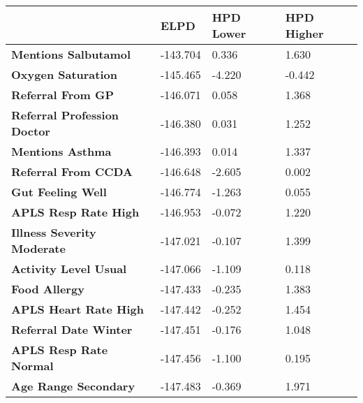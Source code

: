 \renewcommand*{\arraystretch}{1.2}
\scriptsize{
    \begin{longtable}[H]{llll}
        \toprule
                                              & \textbf{ELPD} & \textbf{HPD Lower} & \textbf{HPD Higher} \\\toprule
        \endhead
        \textbf{Mentions Salbutamol}          & -143.704           & 0.336               & 1.630                \\
        \textbf{Oxygen Saturation}                          & -145.465           & -4.220              & -0.442               \\
        \textbf{Referral From GP}               & -146.071           & 0.058               & 1.368                \\
        \textbf{Referral Profession Doctor}     & -146.380           & 0.031               & 1.252                \\
        \textbf{Mentions Asthma}              & -146.393           & 0.014               & 1.337                \\
        \textbf{Referral From CCDA}             & -146.648           & -2.605              & 0.002                \\
        \textbf{Gut Feeling Well}               & -146.774           & -1.263              & 0.055                \\
        \textbf{APLS Resp Rate High}      & -146.953           & -0.072              & 1.220                \\
        \textbf{Illness Severity Moderate}      & -147.021           & -0.107              & 1.399                \\
        \textbf{Activity Level Usual}           & -147.066           & -1.109              & 0.118                \\
        \textbf{Food Allergy}                 & -147.433           & -0.235              & 1.383                \\
        \textbf{APLS Heart Rate High}     & -147.442           & -0.252              & 1.454                \\
        \textbf{Referral Date Winter}           & -147.451           & -0.176              & 1.048                \\
        \textbf{APLS Resp Rate Normal}    & -147.456           & -1.100              & 0.195                \\
        \textbf{Age Range Secondary}            & -147.483           & -0.369              & 1.971                \\

\end{longtable}}
